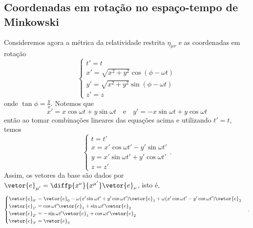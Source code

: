 \subsection*{Coordenadas em rotação no espaço-tempo de Minkowski}
Consideremos agora a métrica da relatividade restrita \(\eta_{\mu\nu}\) e as coordenadas em rotação
\begin{equation*}
    \begin{cases}
        t' = t\\
        x' = \sqrt{x^2 + y^2}\cos{(\phi - \omega t)}\\
        y' = \sqrt{x^2 + y^2}\sin{(\phi - \omega t)}\\
        z' = z
    \end{cases}
\end{equation*}
onde \(\tan\phi = \frac{y}{x}\). Notemos que
\begin{equation*}
    x' = x\cos{\omega t} + y\sin{\omega t}\quad\text{e}\quad y' = -x\sin{\omega t} + y\cos{\omega t}
\end{equation*}
então ao tomar combinações lineares das equações acima e utilizando \(t' = t\), temos
\begin{equation*}
    \begin{cases}
        t = t'\\
        x = x' \cos{\omega t'} - y' \sin{\omega t'}\\
        y = x'\sin{\omega t'} + y' \cos{\omega t'}\\
        z = z'
    \end{cases}.
\end{equation*}
Assim, os vetores da base são dados por \(\vetor{e}_{\mu'} = \diffp{x^\nu}{x^{\mu'}}\vetor{e}_{\nu}\), isto é,
\begin{equation*}
    \begin{cases}
        \vetor{e}_{0'} = \vetor{e}_0 - \omega(x' \sin{\omega t'} + y' \cos{\omega t'})\vetor{e}_1 + \omega(x' \cos{\omega t'} - y'\cos{\omega t'})\vetor{e}_2\\
        \vetor{e}_{1'} = \cos{\omega t'} \vetor{e}_1 + \sin{\omega t'} \vetor{e}_2\\
        \vetor{e}_{2'} = -\sin{\omega t'} \vetor{e}_1 + \cos{\omega t'} \vetor{e}_2\\
        \vetor{e}_{3'} = \vetor{e}_3
    \end{cases}.
\end{equation*}

